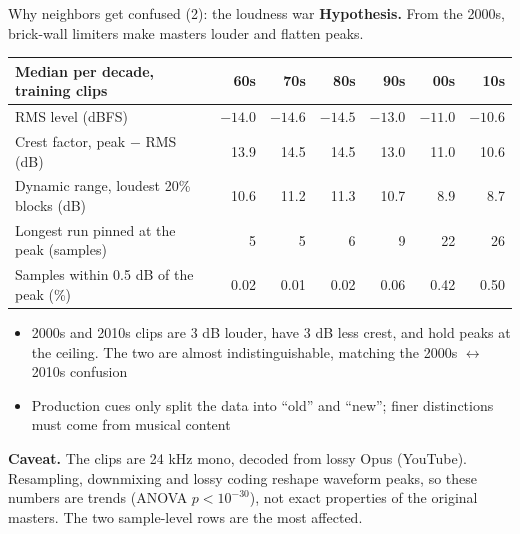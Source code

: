 \documentclass[aspectratio=169,11pt]{beamer}
\newenvironment{tight}{\begin{itemize}\setlength{\itemsep}{1.5pt}\setlength{\parskip}{0pt}\setlength{\topsep}{0pt}}{\end{itemize}}
\begin{document}
\begin{frame}[t]{Why neighbors get confused (2): the loudness war}
  \small
  \textbf{Hypothesis.} From the 2000s, brick-wall limiters make masters louder and flatten peaks.
  \vspace{0.4em}

  \centering
  {\footnotesize
  \begin{tabular}{@{}lrrrrrr@{}}
    \toprule
    Median per decade, training clips & 60s & 70s & 80s & 90s & 00s & 10s \\ \midrule
    RMS level (dBFS)                         & $-14.0$ & $-14.6$ & $-14.5$ & $-13.0$ & \alert{$-11.0$} & \alert{$-10.6$} \\
    Crest factor, peak $-$ RMS (dB)          & 13.9 & 14.5 & 14.5 & 13.0 & \alert{11.0} & \alert{10.6} \\
    Dynamic range, loudest 20\% blocks (dB)  & 10.6 & 11.2 & 11.3 & 10.7 & \alert{8.9}  & \alert{8.7} \\
    Longest run pinned at the peak (samples) & 5 & 5 & 6 & 9 & \alert{22} & \alert{26} \\
    Samples within 0.5 dB of the peak (\%)   & 0.02 & 0.01 & 0.02 & 0.06 & \alert{0.42} & \alert{0.50} \\
    \bottomrule
  \end{tabular}}
  \vspace{0.5em}

  \raggedright
  \begin{tight}\footnotesize
    \item 2000s and 2010s clips are 3 dB louder, have 3 dB less crest, and hold peaks at the ceiling.
          The two are \alert{almost indistinguishable}, matching the 2000s $\leftrightarrow$ 2010s confusion
    \item Production cues only split the data into ``old'' and ``new''; finer distinctions must come from musical content
  \end{tight}
  \vspace{0.5em}
  {\scriptsize\color{gray}\textbf{Caveat.} The clips are 24 kHz mono, decoded from lossy Opus (YouTube). Resampling, downmixing and lossy coding
  reshape waveform peaks, so these numbers are trends (ANOVA $p < 10^{-30}$), not exact properties of the original masters.
  The two sample-level rows are the most affected.\par}
\end{frame}
\end{document}

